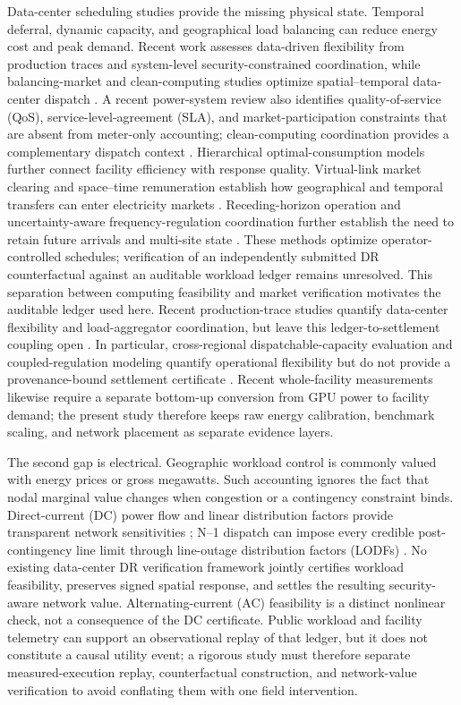 \documentclass[10pt,journal]{IEEEtran}
\begin{document}
Data-center scheduling studies provide the missing physical state. Temporal
deferral, dynamic capacity, and geographical load balancing can reduce energy
cost and peak demand. Recent work assesses data-driven flexibility from
production traces and system-level
security-constrained coordination, while balancing-market and clean-computing
studies optimize spatial--temporal data-center dispatch
\cite{cao2022flexibility,cao2024nonwire}. A recent power-system review also
identifies quality-of-service (QoS), service-level-agreement (SLA), and
market-participation constraints that are absent from meter-only accounting;
clean-computing coordination provides a complementary dispatch context
\cite{takci2025flexibility,riepin2025clean}.
Hierarchical optimal-consumption models further connect facility efficiency
with response quality.
Virtual-link market clearing and space--time remuneration establish how
geographical and temporal transfers can enter electricity markets
\cite{zhang2020virtuallinks,zhang2022remunerating}. Receding-horizon operation
and uncertainty-aware frequency-regulation coordination further establish the
need to retain future arrivals and multi-site state
\cite{zhang2023receding}. These methods optimize
operator-controlled schedules; verification of an independently submitted
DR counterfactual against an auditable workload ledger remains unresolved. This separation between
computing feasibility and market verification motivates the auditable ledger
used here. Recent production-trace studies quantify data-center flexibility and
load-aggregator coordination, but leave this ledger-to-settlement coupling open
\cite{dcaopt2024,caprara2026}. In particular, cross-regional dispatchable-capacity
evaluation and coupled-regulation modeling quantify operational flexibility but
do not provide a provenance-bound settlement certificate
\cite{han2026dispatchable,chen2021idccoupling}. Recent whole-facility measurements likewise
require a separate bottom-up conversion from GPU power to facility demand;
the present study therefore keeps raw energy calibration, benchmark scaling,
and network placement as separate evidence layers.

The second gap is electrical. Geographic workload control is commonly valued
with energy prices or gross megawatts. Such accounting ignores the fact that
nodal marginal value changes when congestion or a contingency constraint
binds. Direct-current (DC) power flow and linear distribution factors provide transparent
network sensitivities \cite{stott2009dc,zimmerman2011matpower}; N--1 dispatch
can impose every credible post-contingency line limit through line-outage
distribution factors (LODFs) \cite{tejada2018lodf}. No existing data-center DR
verification framework jointly certifies workload feasibility, preserves
signed spatial response, and settles the resulting security-aware network
value. Alternating-current (AC) feasibility is a distinct nonlinear check,
not a consequence of the DC certificate. Public workload and facility telemetry can support an observational
replay of that ledger, but it does not constitute a causal utility event; a
rigorous study must therefore separate measured-execution replay, counterfactual
construction, and network-value verification to avoid conflating them with one
field intervention.
\end{document}
